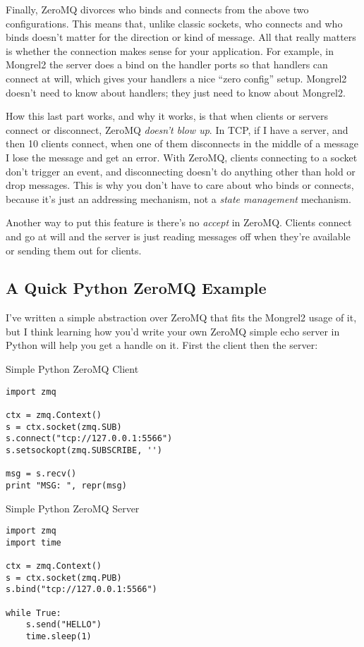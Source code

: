 Finally, ZeroMQ divorces who binds and connects from the above two
configurations.  This means that, unlike classic sockets, who connects and who
binds doesn't matter for the direction or kind of message.  All that really
matters is whether the connection makes sense for your application.  For
example, in Mongrel2 the server does a bind on the handler ports so that
handlers can connect at will, which gives your handlers a nice ``zero config''
setup.  Mongrel2 doesn't need to know about handlers; they just need to know
about Mongrel2.

How this last part works, and why it works, is that when clients or servers
connect or disconnect, ZeroMQ \emph{doesn't blow up}.  In TCP, if I have a
server, and then 10 clients connect, when one of them disconnects in the middle
of a message I lose the message and get an error.  With ZeroMQ, clients
connecting to a socket don't trigger an event, and disconnecting doesn't do
anything other than hold or drop messages.  This is why you don't have to care
about who binds or connects, because it's just an addressing mechanism, not a
\emph{state management} mechanism.

Another way to put this feature is there's no \emph{accept} in ZeroMQ.  Clients
connect and go at will and the server is just reading messages off when they're
available or sending them out for clients.


\subsection{A Quick Python ZeroMQ Example}

I've written a simple abstraction over ZeroMQ that fits the Mongrel2 usage of it, but
I think learning how you'd write your own ZeroMQ simple echo server in Python will
help you get a handle on it.  First the client then the server:

\begin{code}{Simple Python ZeroMQ Client}
\begin{lstlisting}
import zmq

ctx = zmq.Context()
s = ctx.socket(zmq.SUB)
s.connect("tcp://127.0.0.1:5566")
s.setsockopt(zmq.SUBSCRIBE, '')

msg = s.recv()
print "MSG: ", repr(msg)
\end{lstlisting}
\end{code}


\begin{code}{Simple Python ZeroMQ Server}
\begin{lstlisting}
import zmq
import time

ctx = zmq.Context()
s = ctx.socket(zmq.PUB)
s.bind("tcp://127.0.0.1:5566")

while True:
    s.send("HELLO")
    time.sleep(1)
\end{lstlisting}
\end{code}


